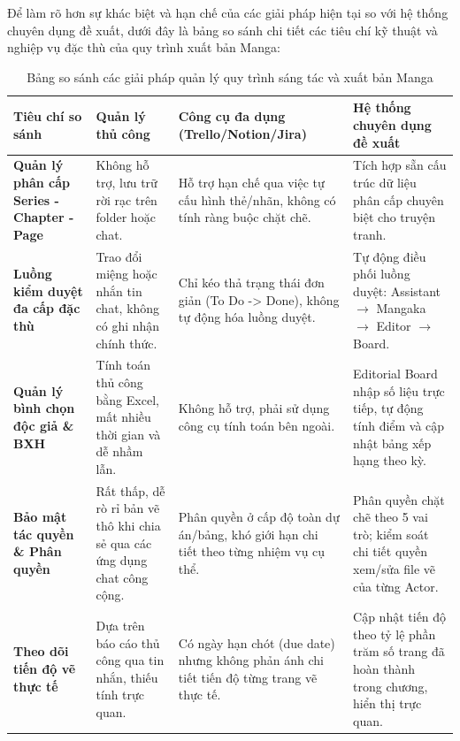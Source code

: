 Để làm rõ hơn sự khác biệt và hạn chế của các giải pháp hiện tại so với hệ thống chuyên dụng đề xuất, dưới đây là bảng so sánh chi tiết các tiêu chí kỹ thuật và nghiệp vụ đặc thù của quy trình xuất bản Manga:

\begin{table}[H]
    \centering
    \renewcommand{\arraystretch}{1.3}
    \begin{tabularx}{\textwidth}{|>{\raggedright\arraybackslash}p{3cm}|>{\raggedright\arraybackslash}X|>{\raggedright\arraybackslash}X|>{\raggedright\arraybackslash}X|}
        \hline
        \rowcolor{tableheader}
        \textbf{Tiêu chí so sánh} & \textbf{Quản lý thủ công} & \textbf{Công cụ đa dụng (Trello/Notion/Jira)} & \textbf{Hệ thống chuyên dụng đề xuất} \rule[-1.2ex]{0pt}{4ex} \\
        \hline
        \textbf{Quản lý phân cấp Series - Chapter - Page} & Không hỗ trợ, lưu trữ rời rạc trên folder hoặc chat. & Hỗ trợ hạn chế qua việc tự cấu hình thẻ/nhãn, không có tính ràng buộc chặt chẽ. & Tích hợp sẵn cấu trúc dữ liệu phân cấp chuyên biệt cho truyện tranh. \\
        \hline
        \textbf{Luồng kiểm duyệt đa cấp đặc thù} & Trao đổi miệng hoặc nhắn tin chat, không có ghi nhận chính thức. & Chỉ kéo thả trạng thái đơn giản (To Do -> Done), không tự động hóa luồng duyệt. & Tự động điều phối luồng duyệt: Assistant $\rightarrow$ Mangaka $\rightarrow$ Editor $\rightarrow$ Board. \\
        \hline
        \textbf{Quản lý bình chọn độc giả \& BXH} & Tính toán thủ công bằng Excel, mất nhiều thời gian và dễ nhầm lẫn. & Không hỗ trợ, phải sử dụng công cụ tính toán bên ngoài. & Editorial Board nhập số liệu trực tiếp, tự động tính điểm và cập nhật bảng xếp hạng theo kỳ. \\
        \hline
        \textbf{Bảo mật tác quyền \& Phân quyền} & Rất thấp, dễ rò rỉ bản vẽ thô khi chia sẻ qua các ứng dụng chat công cộng. & Phân quyền ở cấp độ toàn dự án/bảng, khó giới hạn chi tiết theo từng nhiệm vụ cụ thể. & Phân quyền chặt chẽ theo 5 vai trò; kiểm soát chi tiết quyền xem/sửa file vẽ của từng Actor. \\
        \hline
        \textbf{Theo dõi tiến độ vẽ thực tế} & Dựa trên báo cáo thủ công qua tin nhắn, thiếu tính trực quan. & Có ngày hạn chót (due date) nhưng không phản ánh chi tiết tiến độ từng trang vẽ thực tế. & Cập nhật tiến độ theo tỷ lệ phần trăm số trang đã hoàn thành trong chương, hiển thị trực quan. \\
        \hline
    \end{tabularx}
    \caption{Bảng so sánh các giải pháp quản lý quy trình sáng tác và xuất bản Manga}
    \label{tab:so_sanh_he_thong}
\end{table}

